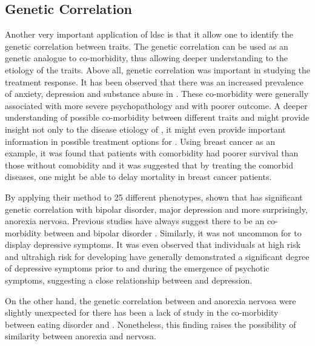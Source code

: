 \documentclass[12pt]{book}
\newcommand*{\glng}{\glsentrylong}
\begin{document}
	\subsection{Genetic Correlation}
	Another very important application of \gls{ldsc} is that it allow one to identify the genetic correlation between traits\citep{Bulik-Sullivan2015a}. 
	The genetic correlation can be used as an genetic analogue to co-morbidity, thus allowing deeper understanding to the etiology of the traits.
	Above all, genetic correlation was important in studying the treatment response. 
	It has been observed that there was an increased prevalence of anxiety, depression and substance abuse in \glng{scz}\citep{Buckley2009}. 
	These co-morbidity were generally associated with more severe psychopathology and with poorer outcome\citep{Buckley2009}.
	A deeper understanding of possible co-morbidity between different traits and \glng{scz} might provide insight not only to the disease etiology of \glng{scz}, it might even provide important information in possible treatment options for \glng{scz}. 
	Using breast cancer as an example, it was found that patients with comorbidity had poorer survival than those without comobidity\citep{Sogaard2013} and it was suggested that by treating the comorbid diseases, one might be able to delay mortality in breast cancer patients\citep{Ording2013}.
		
	By applying their method to 25 different phenotypes, \citet{Bulik-Sullivan2015a} shown that \glng{scz} has significant genetic correlation with bipolar disorder, major depression and more surprisingly, anorexia nervosa.
	Previous studies have always suggest there to be an co-morbidity between \glng{scz} and bipolar disorder \citep{Lichtenstein2009,Purcell2009,Buckley2009}.
	Similarly, it was not uncommon for \glng{scz} to display depressive symptoms\citep{Buckley2009}. 
	It was even observed that individuals at high risk and ultrahigh risk for developing \glng{scz} have generally demonstrated a significant degree of depressive symptoms prior to and during the emergence of psychotic symptoms, suggesting a close relationship between \glng{scz} and depression. 
	
	On the other hand, the genetic correlation between \glng{scz} and anorexia nervosa were slightly unexpected for there has been a lack of study in the co-morbidity between eating disorder and \glng{scz}. 
	Nonetheless, this finding raises the possibility of similarity between anorexia and nervosa.
	
\end{document}
